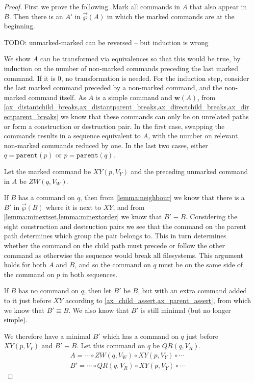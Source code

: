 \documentclass[12pt]{article}
\newcommand{\parent}{\mathtt{parent}}
\newcommand{\fscommand}[2]{{#1#2}}
\newcommand{\cxy}{\fscommand{X}{Y}}
\newcommand{\czw}{\fscommand{Z}{W}}
\newcommand{\cqr}{\fscommand{Q}{R}}
\newcommand{\cc}{\circ} %
\newcommand{\works}[1]{{\mathbf{w}}({#1})}
\newcommand{\orderset}[1]{\vec{\wp}({#1})}
\theoremstyle{definition}
\begin{document}
\begin{proof}
First we prove the following.
Mark all commands in $A$ that also appear in $B$.
Then there is an $A'$ in $\orderset{A}$ in which the marked commands are at the beginning.

\medskip

TODO: unmarked-marked can be reversed -- but induction is wrong

We show $A$ can be transformed via equivalences so that this would be true,
by induction on the number of non-marked commands preceding the last marked command.
If it is 0, no transformation is needed.
For the induction step, consider the last marked command preceded by a non-marked command,
and the non-marked command itself.
As $A$ is a simple command and $\works{A}$, from 
\cref{ax_distantchild_breaks,ax_distantparent_breaks,ax_directchild_breaks,ax_directparent_breaks}
we know that these commands can only be on unrelated paths or form a construction or destruction pair.
In the first case, swapping the commands results in a sequence equivalent to $A$,
with the number on relevant non-marked commands reduced by one.
In the last two cases,
either $q=\parent(p)$ or $p=\parent(q)$.

Let the marked command be $\cxy(p, V_Y)$ and the preceding unmarked command in $A$ be $\czw(q, V_W)$.

If $B$ has a command on $q$, then
from \cref{lemma:neighbour}
we know that there is a $B'$ in $\orderset{B}$ where it is next to $\cxy$,
and from \cref{lemma:minextset,lemma:minextorder} we know that $B'\equiv B$.
Considering the eight construction and destruction pairs we see that the command
on the parent path determines which group the pair belongs to.
This in turn determines whether the command on the child path must
precede or follow the other command as otherwise the sequence would break all filesystems.
This argument holds for both $A$ and $B$, and so the command on $q$ must be on
the same side of the command on $p$ in both sequences.

If $B$ has no command on $q$, then let $B'$ be $B$, but with an extra command added to it just before $\cxy$
according to \cref{ax_child_assert,ax_parent_assert}, from which we know
that $B'\equiv B$.
We also know that $B'$ is still minimal (but no longer simple).

We therefore have a minimal $B'$ which has a command on $q$ just before $\cxy(p, V_Y)$ and $B'\equiv B$.
Let this command on $q$ be $\cqr(q, V_R)$.
\begin{gather*}
A = \cdots\cc  \czw(q, V_W)\cc  \cxy(p, V_Y)\cc  \cdots \\
B' = \cdots\cc  \cqr(q, V_R)\cc  \cxy(p, V_Y)\cc  \cdots
\end{gather*}


\end{proof}
\end{document}
